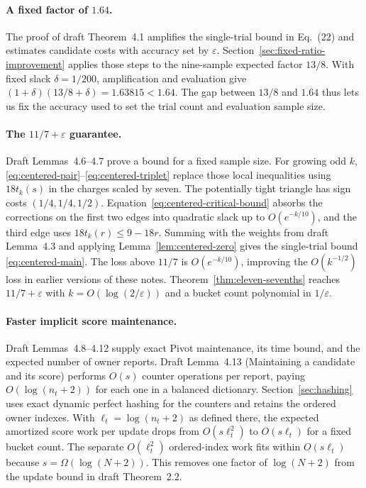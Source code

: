 \documentclass[11pt]{article}
\begin{document}
\paragraph{A fixed factor of $1.64$.}
The proof of draft Theorem~4.1 amplifies the single-trial bound in
Eq.~(22) and estimates candidate costs with accuracy set by
$\varepsilon$. Section~\ref{sec:fixed-ratio-improvement} applies those
steps to the nine-sample expected factor $13/8$. With fixed slack
$\delta=1/200$, amplification and evaluation give
$(1+\delta)(13/8+\delta)=1.63815<1.64$. The gap between $13/8$ and $1.64$
thus lets us fix the accuracy used to set the trial count and
evaluation sample size.

\paragraph{The $11/7+\varepsilon$ guarantee.}
Draft Lemmas~4.6--4.7 prove a bound for a fixed sample size. For growing
odd $k$, \eqref{eq:centered-pair}--\eqref{eq:centered-triplet} replace
those local inequalities using $18t_k(s)$ in the charges scaled by
seven. The potentially tight triangle has sign costs $(1/4,1/4,1/2)$.
Equation~\eqref{eq:centered-critical-bound} absorbs the corrections on
the first two edges into quadratic slack up to $O(e^{-k/10})$, and the
third edge uses $18t_k(r)\le9-18r$. Summing with the weights from draft
Lemma~4.3 and applying Lemma~\ref{lem:centered-zero} gives the
single-trial bound \eqref{eq:centered-main}. The loss above $11/7$ is
$O(e^{-k/10})$, improving the $O(k^{-1/2})$ loss in earlier versions
of these notes. Theorem~\ref{thm:eleven-sevenths} reaches
$11/7+\varepsilon$ with $k=O(\log(2/\varepsilon))$ and a bucket count
polynomial in $1/\varepsilon$.

\paragraph{Faster implicit score maintenance.}
Draft Lemmas~4.8--4.12 supply exact Pivot maintenance, its time bound,
and the expected number of owner reports. Draft Lemma~4.13 (Maintaining
a candidate and its score) performs $O(s)$ counter operations per
report, paying $O(\log(n_t+2))$ for each one in a balanced dictionary.
Section~\ref{sec:hashing} uses exact dynamic perfect hashing for the
counters and retains the ordered owner indexes. With
$\ell_t=\log(n_t+2)$ as defined there, the expected amortized score
work per update drops from $O(s\ell_t^2)$ to $O(s\ell_t)$ for a fixed
bucket count. The separate $O(\ell_t^2)$ ordered-index work fits within
$O(s\ell_t)$ because $s=\Omega(\log(N+2))$. This removes one factor
of $\log(N+2)$ from the update bound in draft Theorem~2.2.
\end{document}
